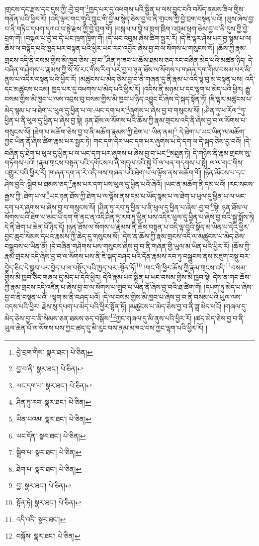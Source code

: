 །གྲངས་དང་རྫས་དང་དུས་ཀྱི་:བྱེ་བྲག་\footnote{བྱེ་བྲག་གིས་  སྣར་ཐང་།  པེ་ཅིན། }ཁྱད་པར་དུ་འཕགས་པའི་སྦྱིན་པ་ལས་བྱུང་བའི་བསོད་ནམས་ཟིལ་གྱིས་གནོན་པའི་ཕྱིར་རོ། །འདི་ལྟར་གང་གཱའི་ཀླུང་གི་བྱེ་མ་སྙེད་ཅེས་བྱ་བ་ནི་གྲངས་ཀྱི་བྱེ་བྲག་བསྟན་པའོ། །ལུས་ཞེས་བྱ་བ་ནི་གཏིང་དཔག་དཀའ་བ་སྟེ་རྫས་ཀྱི་བྱེ་བྲག་གོ། །བསྐལ་པ་བྱེ་བ་ཁྲག་ཁྲིག་འབུམ་ཕྲག་ཅེས་བྱ་བ་ནི་དུས་ཀྱི་བྱེ་བྲག་གོ། །བསྐལ་པ་བྱེ་བ་དེ་ཡང་ཁྲག་ཁྲིག་གོ། །དེ་ཡང་འབུམ་ཞེས་ཚིག་སྦྱར་རོ། །དེ་ཇི་ལྟར་ཤེས་པར་བྱ་སྙམ་པ་ལ། ཆོས་ལ་བསྟོད་པའི་ཁྱད་པར་བསྟན་པའི་ཕྱིར་ཡང་རབ་འབྱོར་ཞེས་བྱ་བ་ལ་སོགས་པ་གསུངས་སོ། །ཆོས་ཀྱི་རྣམ་གྲངས་འདི་ནི་བསམ་གྱིས་མི་ཁྱབ་ཅེས་:བྱ་བ་\footnote{བྱ་བ་ནི་  སྣར་ཐང་།  པེ་ཅིན། }ཤིན་ཏུ་ཟབ་པ་ཆོས་ཐམས་ཅད་རང་བཞིན་མེད་པའི་མཚན་ཉིད། དེ་བཞིན་གཤེགས་པ་རྣམས་ཀྱི་སོ་སོ་རང་གིས་རིག་པར་བྱ་བ་ཉན་ཐོས་ལ་སོགས་པ་གཞན་དག་གིས་བསམ་པར་མི་ནུས་པ་འདིར་བསྟན་པའི་ཕྱིར་རོ། །མཚུངས་པ་མེད་ཅེས་བྱ་བ་ནི་གཞན་དུ་ནི་རྣམ་པ་འདི་ལྟ་བུ་མ་བསྟན་པས། འདི་དང་མཚུངས་པའམ། ཁྱད་པར་དུ་འཕགས་པ་མེད་པའི་ཕྱིར་རོ། །འདིས་ནི་མཉམ་པ་དང་ལྷག་པ་མེད་པའི་ཕྱིར། རྒྱུ་བསམ་གྱིས་མི་ཁྱབ་པ་ལས་འབྲས་བུ་བསམ་གྱིས་མི་ཁྱབ་པ་ཉིད་འབྱུང་ངོ་ཞེས་དེ་སྐད་སྟོན་ཏོ། །ཇི་ལྟར་མཚུངས་པ་མེད་སྙམ་པ་ལ་ཐེག་པ་ཕུལ་དུ་ཕྱིན་པ་ལ་:ཡང་དག་པར་\footnote{ཡང་དག་པ་  སྣར་ཐང་།  པེ་ཅིན། }ཞུགས་པ་ཞེས་བྱ་བ་གསུངས་སོ། །:ཤིན་ཏུ་ཕ་རོལ་\footnote{ཤིན་ཏུ་རབ་  སྣར་ཐང་།  པེ་ཅིན། }ཏུ་ཕྱིན་པ་ནི་ཕུལ་དུ་ཕྱིན་པ་ཞེས་བྱ་སྟེ། ཉན་ཐོས་ལ་སོགས་པའི་ཆོས་ཀྱི་རྣམ་གྲངས་འདི་ནི་ཞེས་བྱ་བ་ལ་སོགས་པ་གསུངས་སོ། །ཐེག་པ་མཆོག་ཅེས་བྱ་བ་ནི་མཆོག་རྣམས་ཀྱི་ཐེག་པ་:ཡིན་ནམ།\footnote{ཡིན་པའམ།  སྣར་ཐང་།  པེ་ཅིན། } དེ་ཐེག་པ་ཡང་ཡིན་ལ་མཆོག་ཀྱང་ཡིན་ནོ་ཞེས་ཚིག་རྣམ་པར་སྦྱར་ཏེ། གང་དག་དེར་ཡང་དག་པར་ཞུགས་པ་དེ་དག་ལ་དེ་སྐད་ཅེས་བྱ་བའོ། །དེ་བཞིན་དུ་ཐེག་པ་ཕུལ་དུ་ཕྱིན་པ་ལ་ཡང་དག་པར་ཞུགས་པ་ཞེས་བྱ་བ་ཡང་\footnote{ཡང་དོན་  སྣར་ཐང་།  པེ་ཅིན། }མཐུན་ཏེ། དེ་གཉིས་ནི་རྣམ་གྲངས་སུ་གཏོགས་པའོ། །རྣམ་གྲངས་བསྟན་པའི་དགོངས་པ་ནི་གདུལ་བའི་སྐྱེ་བོ་ལ་ཕན་གདགས་པ་སྟེ། ལ་ལ་གང་གིས་འགྱུར་བའི་ཕྱིར་རོ། །གཞན་དག་ན་རེ་འདི་ལས་གཞན་པའི་ཐེག་པ་ལ་ལྟོས་ནས་མཆོག་གོ། །ཉོན་མོངས་པ་དང་ཤེས་བྱའི་:སྒྲིབ་པ་ཐམས་ཅད་\footnote{སྒྲིབ་པ་  སྣར་ཐང་།  པེ་ཅིན། }རྣམ་པར་དག་པས་ཕུལ་དུ་ཕྱིན་པའོ་ཞེའོ། །ཡང་ན་མཆོག་ནི་དམ་པའོ། །རང་སངས་རྒྱས་ཀྱི་:ཐེག་པ་ལ་\footnote{ཐེག་པ་  སྣར་ཐང་།  པེ་ཅིན། }ཡང་ཉན་ཐོས་ཀྱི་ཐེག་པ་ལ་ལྟོས་ནས་དམ་པ་ཡོད་སྙམ་པ་ལ་ཐེག་པ་ཕུལ་དུ་ཕྱིན་པ་ལ་ཡང་དག་པར་ཞུགས་པ་ཞེས་བྱ་བ་གསུངས་སོ། །ཤིན་ཏུ་རབ་ཏུ་ཕྱིན་པ་ནི་ཕུལ་དུ་ཕྱིན་པ་ཞེས་:བྱ་བ་\footnote{བྱ་  སྣར་ཐང་།  པེ་ཅིན། }སྟེ། ཉན་ཐོས་ལ་སོགས་པའི་ཐེག་པ་མང་པོ་དག་གི་ནང་ན་འདི་ཤིན་ཏུ་རབ་ཏུ་ཕྱིན་པས་འདིར་ཕུལ་དུ་ཕྱིན་པ་ཞེས་བྱ་བའི་སྒྲ་སྨོས་ཏེ། དེ་ནི་ཐེག་པ་ཆེན་པོ་ཉིད་དོ། །ཉན་ཐོས་ལ་སོགས་པ་རྣམས་ནི་ཆོས་བསྟན་པ་འདི་ལྟ་བུའི་སྣོད་མ་ཡིན་པ་དེའི་ཕྱིར་བྱང་ཆུབ་སེམས་དཔའ་རྣམས་ཀྱི་ཆེད་དུ་གསུངས་སོ། །དེས་ན་ཆོས་ཀྱི་རྣམ་གྲངས་འདི་ལ་མཚུངས་པ་མེད་ཅེས་བསྒྲུབས་པ་ཡིན་ནོ། །དེ་བཞིན་གཤེགས་པས་གསུངས་ཞེས་བྱ་བ་ནི་གཞན་གྱི་ཡུལ་མ་ཡིན་པའི་ཕྱིར་རོ། །ཆོས་ཀྱི་རྣམ་གྲངས་འདི་ཞེས་བྱ་བ་ལ་སོགས་པས་ནི་ཇི་སྐད་བཤད་པའི་དོན་རྣམས་རབ་ཏུ་བསྒྲུབས་ནས་མཇུག་བསྡུ་བར་བྱེད་ཅིང་དེ་སྒྲུབ་པར་བྱེད་པ་ལ་བསྟོད་པའི་ཁྱད་པར་:སྟོན་ཏོ།\footnote{སྟོན་ཏེ།  སྣར་ཐང་།  པེ་ཅིན། } །གང་གི་ཕྱིར་ཆོས་ཀྱི་རྣམ་གྲངས་འདི་\footnote{འདི་འདི་  སྣར་ཐང་། }བསམ་གྱིས་མི་ཁྱབ་ཅིང་གཞལ་དུ་མེད་པ་དེའི་ཕྱིར། དེའི་རྣམ་པར་སྨིན་པ་ཡང་བསམ་གྱིས་མི་ཁྱབ་སྟེ། དེས་ན་གང་ཆོས་ཀྱི་རྣམ་གྲངས་འདི་འཛིན་པ་ཞེས་བྱ་བ་ལ་སོགས་པ་གྲུབ་པ་ཡིན་ནོ་ཞེས་བྱ་བའི་ཐ་ཚིག་གོ། །དཔག་ཏུ་མེད་པ་ཞེས་བྱ་བ་ནི་བསྟན་པའོ། །ལྷག་མ་ནི་བཤད་པའོ། །དེ་ལ་བསམ་གྱིས་མི་ཁྱབ་པ་ཞེས་བྱ་བ་ནི་བསམ་པའི་ཡུལ་ལས་འདས་པའི་ཕྱིར། རྗེས་སུ་དཔག་པ་མེད་པའི་ཕྱིར་སྟོན་ཏོ། །མཚུངས་པ་མེད་ཅེས་བྱ་བ་ནི་ཟླ་མེད་པའོ། །གཞལ་དུ་མེད་ཅེས་བྱ་བ་ནི་སེམས་ཅན་ཐམས་ཅད་བསྒོས་\footnote{བསྐོས་  སྣར་ཐང་།  པེ་ཅིན། }ཀྱང་གཞལ་དུ་མི་ནུས་པའི་ཕྱིར་རོ། །ཚད་མེད་ཅེས་བྱ་བ་ནི་ཡུལ་ཆེན་པོ་ལ་སོགས་པས་ཀྱང་ཚད་དུ་མི་རུང་བས་ནམ་མཁའ་བས་ཀྱང་ལྷག་པའི་ཕྱིར་རོ། །
